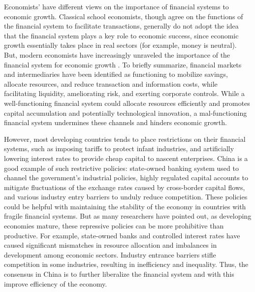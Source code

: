 \documentclass[AER]{AEA}
\begin{document}
Economists' have different views on the importance of financial 
systems to economic growth. Classical school economists, though agree on the 
functions of the financial system to facilitate transactions, generally 
do not adopt the idea that the financial system plays a key role to economic success, 
since economic growth  essentially takes place in real sectors 
(for example, money is neutral). 
But, modern economists have increasingly unraveled the importance of the 
financial system for economic growth \citep{boyd1986,levine1991,bekaert2001}.
To briefly summarize, financial markets and intermediaries have been identified 
as functioning to mobilize savings, allocate resources, and 
reduce transaction and information costs, while facilitating liquidity, 
ameliorating risk, and exerting corporate controls. 
While a well-functioning financial system could allocate resources 
efficiently and promotes capital accumulation and potentially technological  
innovation, a mal-functioning financial system undermines these channels 
and hinders economic growth. 

However, most developing countries tends to place  
restrictions on their financial systems, such as imposing  
tariffs to protect infant industries, and artificially lowering  
interest rates to provide cheap capital to nascent enterprises. 
China is a good example of such restrictive policies:  
state-owned banking system used to channel the government's industrial  
policies, highly regulated capital accounts to mitigate  
fluctuations of the exchange rates caused by cross-border capital 
flows, and various industry entry barriers to unduly reduce competition.
These policies could be helpful with maintaining the stability of the economy 
in countries with fragile financial systems. 
But as many researchers have pointed out,  as developing economies mature,
these repressive policies can be more prohibitive than productive.
For example, state-owned banks and controlled interest rates have caused 
significant mismatches in resource allocation and imbalances in development 
among economic sectors. 
Industry entrance barriers stifle competition in some industries,  
resulting in inefficiency and inequality. 
Thus, the consensus in China is to further liberalize the financial system 
and with this improve efficiency of the economy.
\end{document}
